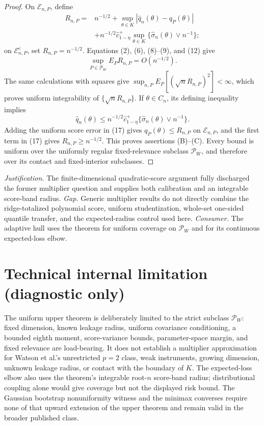 \documentclass{article}
\begin{document}
\begin{proof}
On \(\mathcal E_{n,P}\), define
\[
 \begin{aligned}
 R_{n,P}={}&n^{-1/2}
 +\sup_{\theta\in K}|\widehat q_n(\theta)-q_P(\theta)|\\
 &+n^{-1/2}\widehat c_{1-\eta}^+
 \sup_{\theta\in K}\{\widehat\sigma_n(\theta)\vee n^{-1}\};
 \end{aligned} \tag{17}
\]
on \(\mathcal E_{n,P}^c\), set \(R_{n,P}=n^{-1/2}\). Equations (2), (6), (8)--(9), and (12) give
\[
 \sup_{P\in\mathcal P_W}E_PR_{n,P}=O(n^{-1/2}). \tag{18}
\]
The same calculations with squares give \(\sup_{n,P}E_P[(\sqrt nR_{n,P})^2]<\infty\), which proves uniform integrability of \(\{\sqrt nR_{n,P}\}\). If \(\theta\in C_n\), its defining inequality implies
\[
 \widehat q_n(\theta)
 \leq n^{-1/2}\widehat c_{1-\eta}^+
 \{\widehat\sigma_n(\theta)\vee n^{-1}\}. \tag{19}
\]
Adding the uniform score error in (17) gives \(q_P(\theta)\leq R_{n,P}\) on \(\mathcal E_{n,P}\), and the first term in (17) gives \(R_{n,P}\geq n^{-1/2}\). This proves assertions (B)--(C). Every bound is uniform over the uniformly regular fixed-relevance subclass \(\mathcal P_W\), and therefore over its contact and fixed-interior subclasses.
\end{proof}
\par\smallskip\noindent \textit{Justification.} The finite-dimensional quadratic-score argument fully discharged the former multiplier question and supplies both calibration and an integrable score-band radius. \textit{Gap.} Generic multiplier results do not directly combine the ridge-totalized polynomial score, uniform studentization, whole-set one-sided quantile transfer, and the expected-radius control used here. \textit{Consumer.} The adaptive hull uses the theorem for uniform coverage on \(\mathcal P_W\) and for its continuous expected-loss elbow.

\section*{Technical internal limitation (diagnostic only)}

The uniform upper theorem is deliberately limited to the strict subclass \(\mathcal P_W\): fixed dimension, known leakage radius, uniform covariance conditioning, a bounded eighth moment, score-variance bounds, parameter-space margin, and fixed relevance are load-bearing. It does not establish a multiplier approximation for Watson et al.'s unrestricted \(p=2\) class, weak instruments, growing dimension, unknown leakage radius, or contact with the boundary of \(K\). The expected-loss elbow also uses the theorem's integrable root-\(n\) score-band radius; distributional coupling alone would give coverage but not the displayed risk bound. The Gaussian bootstrap nonuniformity witness and the minimax converses require none of that upward extension of the upper theorem and remain valid in the broader published class.
\end{document}
